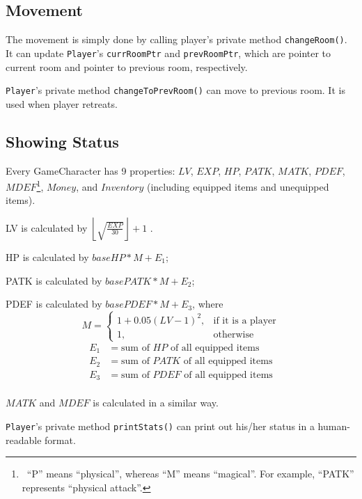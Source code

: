 \documentclass{article}
\begin{document}
    \subsection{Movement}
    The movement is simply done by calling player's private method \texttt{changeRoom()}. It can update \texttt{Player}'s \texttt{currRoomPtr} and \texttt{prevRoomPtr}, which are pointer to current room and pointer to previous room, respectively.
    \par
    \texttt{Player}'s private method \texttt{changeToPrevRoom()} can move to previous room. It is used when player retreats.
    
    \subsection{Showing Status}\label{subsection:show_stats}
    Every GameCharacter has 9 properties: $LV$, $EXP$, $HP$, $PATK$, $MATK$, $PDEF$, $MDEF$\footnote{\ ``P'' means ``physical'', whereas ``M'' means ``magical''. For example, ``PATK'' represents ``physical attack''.}, $Money$, and $Inventory$ (including equipped items and unequipped items). 
    \par
    LV is calculated by
    $\left\lfloor\sqrt{\frac{EXP}{30}}\right\rfloor+1$ .
    \par
    HP is calculated by
    $baseHP*M+E_1$;
    \par
    PATK is calculated by
    $basePATK*M+E_2$;
    \par
    PDEF is calculated by
    $basePDEF*M+E_3$, where 
    \begin{displaymath}
        M = 
            \begin{cases}
                1+0.05(LV-1)^{2},& \text{if it is a player}\\
                1,                 & \text{otherwise}
            \end{cases}
    \end{displaymath}
    \begin{displaymath}
        \begin{aligned}
            E_1 &= \text{sum of $HP$ of all equipped items} \\
            E_2 &= \text{sum of $PATK$ of all equipped items} \\
            E_3 &= \text{sum of $PDEF$ of all equipped items} \\
        \end{aligned}
    \end{displaymath}
    \par
    $MATK$ and $MDEF$ is calculated in a similar way.
    \par
    \texttt{Player}'s private method \texttt{printStats()} can print out his/her status in a human-readable format.
    
\end{document}
